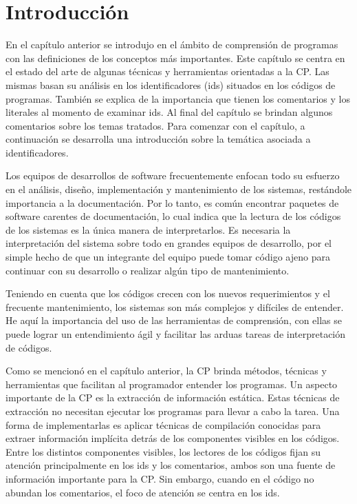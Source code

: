 

\section{Introducción}

En el capítulo anterior se introdujo en el ámbito de comprensión de programas con las definiciones de los conceptos más importantes. Este capítulo se centra en el estado del arte de algunas técnicas y herramientas orientadas a la CP. Las mismas basan su análisis en los identificadores (ids) situados en los códigos de programas. También se explica de la importancia que tienen los comentarios y los literales al momento de examinar ids. Al final del capítulo se brindan algunos comentarios sobre los temas tratados. Para comenzar con el capítulo, a continuación se desarrolla una introducción sobre la temática asociada a identificadores.

Los equipos de desarrollos de software frecuentemente enfocan todo su esfuerzo en el análisis, diseño, implementación y mantenimiento de los sistemas, restándole importancia a la documentación. Por lo tanto, es común encontrar paquetes de software carentes de documentación, lo cual indica que la lectura de los códigos de los sistemas es la única manera de interpretarlos. Es necesaria la interpretación del sistema sobre todo en grandes equipos de desarrollo, por el simple hecho de que un integrante del equipo puede tomar código ajeno para continuar con su desarrollo o realizar algún tipo de mantenimiento.

Teniendo en cuenta que los códigos crecen con los nuevos requerimientos y el frecuente mantenimiento, los sistemas son más complejos y difíciles de entender. He aquí la importancia del uso de las herramientas de comprensión, con ellas se puede lograr un entendimiento ágil y facilitar las arduas tareas de interpretación de códigos.

Como se mencionó en el capítulo anterior, la CP brinda métodos, técnicas y herramientas que facilitan al programador entender los programas. Un aspecto importante de la CP es la extracción de información estática. Estas técnicas de extracción no necesitan ejecutar los programas para llevar a cabo la tarea. Una forma de implementarlas es aplicar técnicas de compilación conocidas para extraer información implícita detrás de los componentes visibles en los códigos.
Entre los distintos componentes visibles, los lectores de los códigos fijan su atención principalmente en los ids y los comentarios, ambos son una fuente de información importante para la CP. Sin embargo, cuando en el código no abundan los comentarios, el foco de atención se centra en los ids. 

